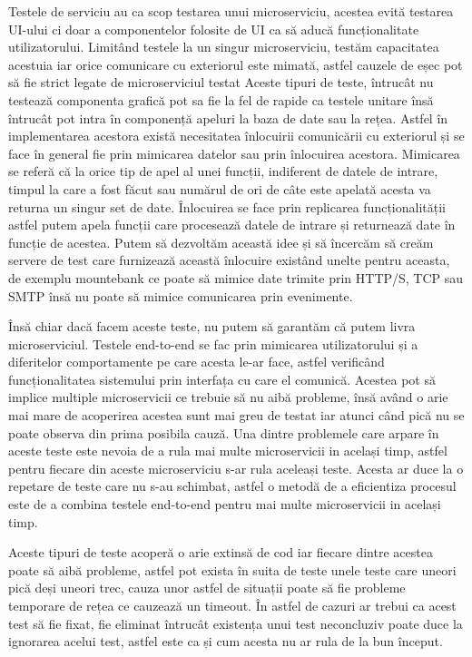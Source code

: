 Testele de serviciu au ca scop testarea unui microserviciu, acestea evită testarea UI-ului
ci doar a componentelor folosite de UI ca să aducă funcționalitate utilizatorului. Limitând
testele la un singur microserviciu, testăm capacitatea acestuia iar orice comunicare cu exteriorul
este mimată, astfel cauzele de eșec pot să fie strict legate de microserviciul testat
Aceste tipuri de teste, întrucât nu testează componenta grafică pot sa fie la fel de rapide
ca testele unitare însă întrucât pot intra în componență apeluri la baza de date sau la rețea.
Astfel în implementarea acestora există necesitatea înlocuirii comunicării cu exteriorul și se
face în general fie prin mimicarea datelor sau prin înlocuirea acestora. Mimicarea se referă
că la orice tip de apel al unei funcții, indiferent de datele de intrare, timpul la care a fost
făcut sau numărul de ori de câte este apelată acesta va returna un singur set de date. Înlocuirea
se face prin replicarea funcționalității astfel putem apela funcții care procesează datele de 
intrare și returnează date în funcție de acestea. Putem să dezvoltăm această idee și să 
încercăm să creăm servere de test care furnizează această înlocuire existând unelte pentru aceasta,
de exemplu mountebank ce poate să mimice date trimite prin HTTP/S, TCP sau SMTP însă nu poate să
mimice comunicarea prin evenimente.

Însă chiar dacă facem aceste teste, nu putem să garantăm că putem livra microserviciul.
Testele end-to-end se fac prin mimicarea utilizatorului și a diferitelor comportamente pe care 
acesta le-ar face, astfel verificând funcționalitatea sistemului prin interfața cu care el comunică. 
Acestea pot să implice multiple microservicii ce trebuie să nu aibă probleme, însă având o arie mai mare 
de acoperirea acestea sunt mai greu de testat iar atunci când pică nu se poate observa din 
prima posibila cauză. Una dintre problemele care arpare în aceste teste este nevoia de a rula
mai multe microservicii in același timp, astfel pentru fiecare din aceste microserviciu s-ar rula aceleași
teste. Acesta ar duce la o repetare de teste care nu s-au schimbat, astfel o metodă de a eficientiza
procesul este de a combina testele end-to-end pentru mai multe microservicii in același timp.

Aceste tipuri de teste acoperă o arie extinsă de cod iar fiecare dintre acestea poate să aibă
probleme, astfel pot exista în suita de teste unele teste care uneori pică deși uneori trec, cauza
unor astfel de situații poate să fie probleme temporare de rețea ce cauzează un timeout.
În astfel de cazuri ar trebui ca acest test să fie fixat, fie eliminat întrucât existența 
unui test neconcluziv poate duce la ignorarea acelui test, astfel este ca și cum acesta nu ar
rula de la bun început. 

